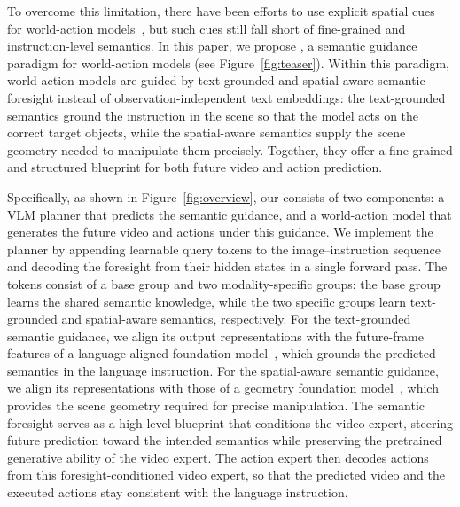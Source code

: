 To overcome this limitation, there have been efforts to use explicit spatial cues for world-action models~\cite{maskwam,maskwm}, but such cues still fall short of fine-grained and instruction-level semantics.
In this paper, we propose \ourmethod, a semantic guidance paradigm for world-action models (see Figure~\ref{fig:teaser}). Within this paradigm, world-action models are guided by text-grounded and spatial-aware semantic foresight instead of observation-independent text embeddings: the text-grounded semantics ground the instruction in the scene so that the model acts on the correct target objects, while the spatial-aware semantics supply the scene geometry needed to manipulate them precisely.
Together, they offer a fine-grained and structured blueprint for both future video and action prediction.

Specifically, as shown in Figure~\ref{fig:overview}, our \ourmethod consists of two components: a VLM planner that predicts the semantic guidance, and a world-action model that generates the future video and actions under this guidance.
We implement the planner by appending learnable query tokens to the image--instruction sequence and decoding the foresight from their hidden states in a single forward pass.
The tokens consist of a base group and two modality-specific groups: the base group learns the shared semantic knowledge, while the two specific groups learn text-grounded and spatial-aware semantics, respectively.
For the text-grounded semantic guidance, we align its output representations with the future-frame features of a language-aligned foundation model~\cite{siglip2}, which grounds the predicted semantics in the language instruction.
For the spatial-aware semantic guidance, we align its representations with those of a geometry foundation model~\cite{lin2025depth}, which provides the scene geometry required for precise manipulation.
The semantic foresight serves as a high-level blueprint that conditions the video expert, steering future prediction toward the intended semantics while preserving the pretrained generative ability of the video expert.
The action expert then decodes actions from this foresight-conditioned video expert, so that the predicted video and the executed actions stay consistent with the language instruction.

